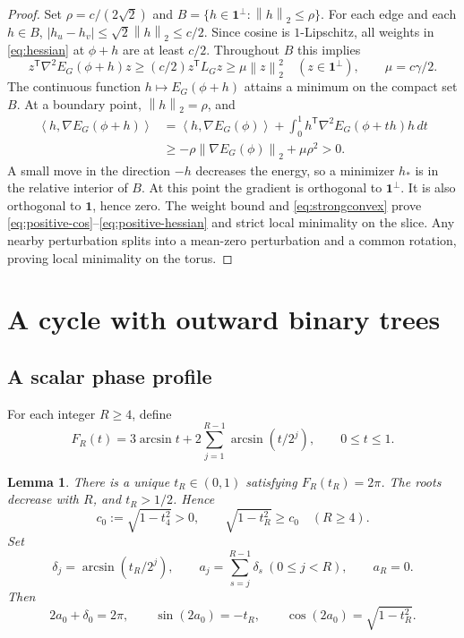 \documentclass[11pt]{article}
\newtheorem{lemma}[theorem]{Lemma}
\theoremstyle{definition}
\theoremstyle{remark}
\newcommand{\one}{\mathbf 1}
\newcommand{\norm}[1]{\left\lVert#1\right\rVert}
\newcommand{\ip}[2]{\left\langle#1,#2\right\rangle}
\newcommand{\asin}{\operatorname{arcsin}}
\begin{document}
\begin{proof}
Set $\rho=c/(2\sqrt2)$ and
$B=\{h\in\one^\perp:\norm h_2\le\rho\}$.
For each edge and each $h\in B$,
$|h_u-h_v|\le\sqrt2\norm h_2\le c/2$.
Since cosine is $1$-Lipschitz, all weights in \eqref{eq:hessian} at
$\phi+h$ are at least $c/2$. Throughout $B$ this implies
\begin{equation}\label{eq:strongconvex}
 z^{\mathsf T}\nabla^2E_G(\phi+h)z
  \ge(c/2)z^{\mathsf T}L_Gz
  \ge\mu\norm z_2^2\quad(z\in\one^\perp),\qquad \mu=c\gamma/2.
\end{equation}
The continuous function $h\mapsto E_G(\phi+h)$ attains a minimum on the
compact set $B$. At a boundary point, $\norm h_2=\rho$, and
\begin{align*}
 \ip h{\nabla E_G(\phi+h)}
 &=\ip h{\nabla E_G(\phi)}
   +\int_0^1h^{\mathsf T}\nabla^2E_G(\phi+th)h\,dt\\
 &\ge-\rho\norm{\nabla E_G(\phi)}_2+\mu\rho^2>0.
\end{align*}
A small move in the direction $-h$ decreases the energy, so a minimizer
$h_*$ is in the relative interior of $B$. At this point the gradient is
orthogonal to $\one^\perp$. It is also orthogonal to $\one$, hence zero.
The weight bound and \eqref{eq:strongconvex} prove
\eqref{eq:positive-cos}--\eqref{eq:positive-hessian} and strict local
minimality on the slice. Any nearby perturbation splits into a mean-zero
perturbation and a common rotation, proving local minimality on the torus.
\end{proof}

\section{A cycle with outward binary trees}

\subsection{A scalar phase profile}

For each integer $R\ge4$, define
\begin{equation}\label{eq:F}
 F_R(t)=3\asin t+2\sum_{j=1}^{R-1}\asin(t/2^j),\qquad 0\le t\le1.
\end{equation}

\begin{lemma}\label{lem:profile}
There is a unique $t_R\in(0,1)$ satisfying $F_R(t_R)=2\pi$.
The roots decrease with $R$, and $t_R>1/2$. Hence
\begin{equation}\label{eq:c0}
 c_0:=\sqrt{1-t_4^2}>0,\qquad \sqrt{1-t_R^2}\ge c_0\quad(R\ge4).
\end{equation}
Set
\begin{equation}\label{eq:profile}
 \delta_j=\asin(t_R/2^j),\qquad
 a_j=\sum_{s=j}^{R-1}\delta_s\ (0\le j<R),\qquad a_R=0.
\end{equation}
Then
\begin{equation}\label{eq:rootbalance}
 2a_0+\delta_0=2\pi,\qquad
 \sin(2a_0)=-t_R,\qquad
 \cos(2a_0)=\sqrt{1-t_R^2}.
\end{equation}
\end{lemma}
\end{document}
